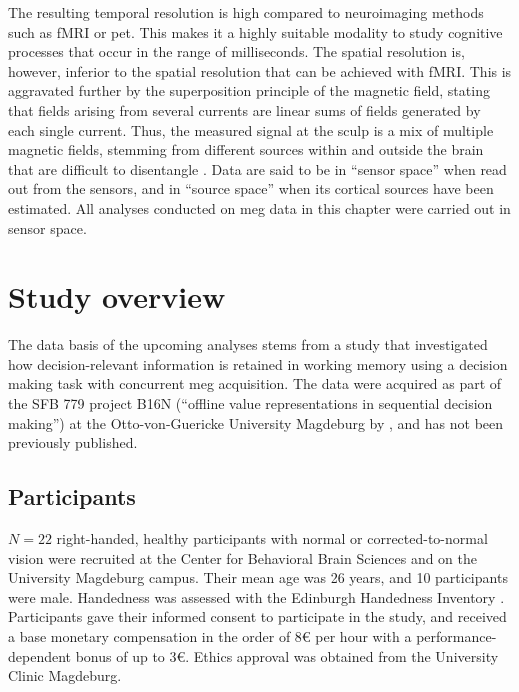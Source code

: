 The resulting temporal resolution is high compared to neuroimaging methods such as \gls{fMRI} or \gls{pet}.
This makes it a highly suitable modality to study cognitive processes that occur in the range of milliseconds.
The spatial resolution is, however, inferior to the spatial resolution that can be achieved with \gls{fMRI}.
This is aggravated further by the superposition principle of the magnetic field, stating that fields arising from several currents are linear sums of fields generated by each single current.
Thus, the measured signal at the sculp is a mix of multiple magnetic fields, stemming from different sources within and outside the brain that are difficult to disentangle \citep{hari2017primer}.
Data are said to be in ``sensor space'' when read out from the sensors, and in ``source space'' when its cortical sources have been estimated.
All analyses conducted on \gls{meg} data in this chapter were carried out in sensor space.



\section{Study overview}


The data basis of the upcoming analyses stems from a study that investigated how decision-relevant information is retained in working memory using a decision making task with concurrent \gls{meg} acquisition.
The data were acquired as part of the SFB 779 project B16N (``offline value representations in sequential decision making'') at the Otto-von-Guericke University Magdeburg by \citet{kaiser}, and has not been previously published.


\subsection{Participants}

$N = 22$ right-handed, healthy participants with normal or corrected-to-normal vision were recruited at the Center for Behavioral Brain Sciences and on the University Magdeburg campus.
Their mean age was 26 years, and 10 participants were male.
Handedness was assessed with the Edinburgh Handedness Inventory \citep{oldfield1971assessment}.
Participants gave their informed consent to participate in the study, and received a base monetary compensation in the order of 8€ per hour with a performance-dependent bonus of up to 3€.
Ethics approval was obtained from the University Clinic Magdeburg.

